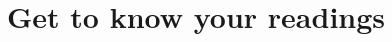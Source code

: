 \documentclass[fleqn,reqno,10pt,draft]{article}
\newcommand{\lc}{\acro{lc}}
\newcommand{\ec}{\acro{ec}}
\newcommand{\LC}{\lc}
\newcommand{\EC}{\ec}
\begin{document}

\medskip



\section{Get to know your readings}
\label{sec:get-know-your}
\end{document}
